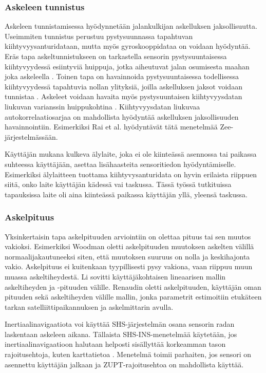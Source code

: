 \subsubsection{Askeleen tunnistus}

Askeleen tunnistamisessa hyödynnetään jalankulkijan askelluksen jaksollisuutta.
Useimmiten tunnistus perustuu pystysuunnassa tapahtuvan kiihtyvyysanturidataan,
mutta myös gyroskooppidataa on voidaan hyödyntää. Eräs tapa askeltunnistukseen
on tarkastella sensorin pystysuuntaisessa kiihtyvyydessä esiintyviä huippuja,
jotka aiheutuvat jalan osumisesta maahan joka askeleella \cite{wang2012}.
Toinen tapa on havainnoida pystysuuntaisessa todellisessa kiihtyvyydessä
tapahtuvia nollan ylityksiä, joilla askelluksen jaksot voidaan tunnistaa
\cite{fadjukoff2013}. Askeleet voidaan havaita myös pystysuuntaisen
kiihtyvyysdatan liukuvan varianssin huippukohtina \cite{steinhoff2010}.
Kiihtyvyysdatan liukuvaa autokorrelaatiosarjaa on mahdollista hyödyntää
askelluksen jaksollisuuden havainnointiin. Esimerkiksi Rai et al.
\cite{rai2012} hyödyntävät tätä menetelmää Zee-järjestelmässään.

Käyttäjän mukana kulkeva älylaite, joka ei ole kiinteässä asennossa
tai paikassa suhteessa käyttäjään, asettaa lisähaasteita sensoritiedon
hyödyntämiselle. Esimerkiksi älylaitteen tuottama kiihtyvysanturidata
on hyvin erilaista riippuen siitä, onko laite käyttäjän kädessä vai
taskussa. Tässä työssä tutkituissa tapauksissa laite oli aina kiinteässä
paikassa käyttäjän yllä, yleensä taskussa.

\subsubsection{Askelpituus}

Yksinkertaisin tapa askelpituuden arviointiin on olettaa pituus tai
sen muutos vakioksi. Esimerkiksi Woodman \cite{woodman2008} oletti
askelpituuden muutoksen askelten välillä normaalijakautuneeksi siten,
että muutoksen suuruus on nolla ja keskihajonta vakio. Askelpituus
ei kuitenkaan tyypillisesti pysy vakiona, vaan riippuu muun muassa
askeltiheydestä. Li \cite{li2012} sovitti käyttäjäkohtaisen lineaarisen
mallin askeltiheyden ja -pituuden välille. Renaudin
\cite{renaudin2013} oletti askelpituuden, käyttäjän oman pituuden sekä
askeltiheyden välille mallin, jonka parametrit estimoitiin etukäteen
tarkan satelliittipaikannuksen ja askelmittarin avulla.

Inertiaalinavigaatiota voi käyttää SHS-järjestelmän osana sensorin radan
laskentaan askeleen aikana. Tällaista SHS-INS-menetelmää käytetään,
jos inertiaalinavigaatioon halutaan helposti sisällyttää korkeamman
tason rajoitusehtoja, kuten karttatietoa \cite{woodman2008}. Menetelmä
toimii parhaiten, jos sensori on asennettu käyttäjän jalkaan ja
ZUPT-rajoitusehtoa on mahdollista käyttää.

